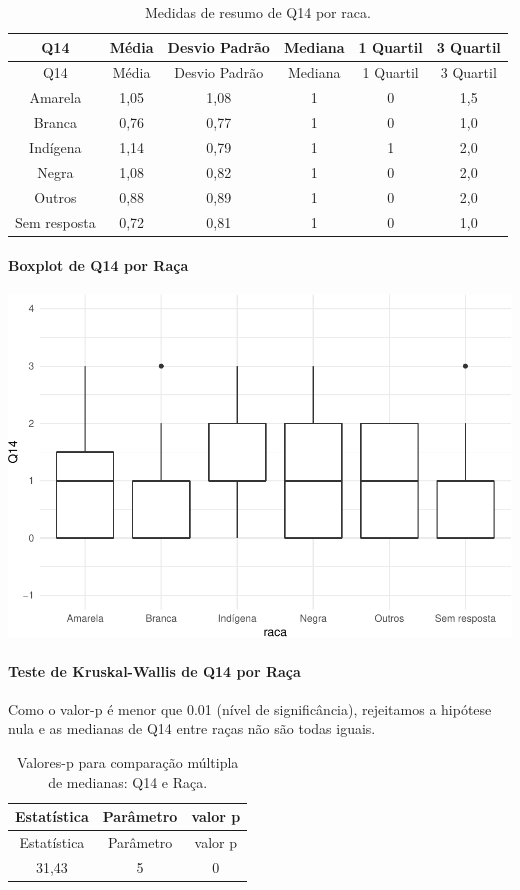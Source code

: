 \documentclass[]{article}
\let\oldparagraph\paragraph
\renewcommand{\paragraph}[1]{\oldparagraph{#1}\mbox{}}
\begin{document}
\begin{longtable}[]{@{}cccccc@{}}
\caption{\label{tab:unnamed-chunk-47}Medidas de resumo de Q14 por raca.}\tabularnewline
\toprule
Q14 & Média & Desvio Padrão & Mediana & 1 Quartil & 3 Quartil\tabularnewline
\midrule
\endfirsthead
\toprule
Q14 & Média & Desvio Padrão & Mediana & 1 Quartil & 3 Quartil\tabularnewline
\midrule
\endhead
Amarela & 1,05 & 1,08 & 1 & 0 & 1,5\tabularnewline
Branca & 0,76 & 0,77 & 1 & 0 & 1,0\tabularnewline
Indígena & 1,14 & 0,79 & 1 & 1 & 2,0\tabularnewline
Negra & 1,08 & 0,82 & 1 & 0 & 2,0\tabularnewline
Outros & 0,88 & 0,89 & 1 & 0 & 2,0\tabularnewline
Sem resposta & 0,72 & 0,81 & 1 & 0 & 1,0\tabularnewline
\bottomrule
\end{longtable}

\hypertarget{boxplot-de-q14-por-rauxe7a}{%
\paragraph{Boxplot de Q14 por Raça}\label{boxplot-de-q14-por-rauxe7a}}

\begin{center}\includegraphics[width=0.75\linewidth]{relatorio_covid19_files/figure-latex/unnamed-chunk-48-1} \end{center}

\hypertarget{teste-de-kruskal-wallis-de-q14-por-rauxe7a}{%
\paragraph{Teste de Kruskal-Wallis de Q14 por Raça}\label{teste-de-kruskal-wallis-de-q14-por-rauxe7a}}

Como o valor-p é menor que 0.01 (nível de significância), rejeitamos a hipótese nula e as medianas de Q14 entre raças não são todas iguais.

\begin{longtable}[]{@{}ccc@{}}
\caption{\label{tab:unnamed-chunk-50}Valores-p para comparação múltipla de medianas: Q14 e Raça.}\tabularnewline
\toprule
Estatística & Parâmetro & valor p\tabularnewline
\midrule
\endfirsthead
\toprule
Estatística & Parâmetro & valor p\tabularnewline
\midrule
\endhead
31,43 & 5 & 0\tabularnewline
\bottomrule
\end{longtable}
\end{document}

